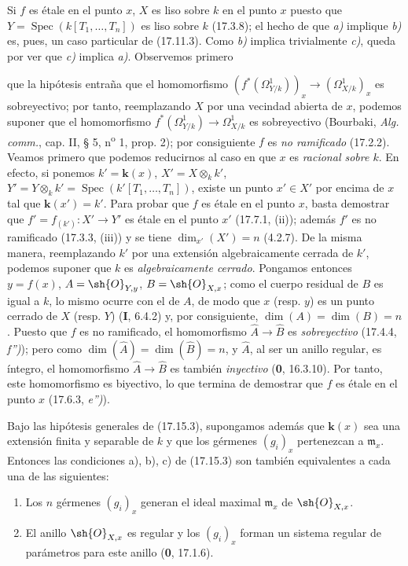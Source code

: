 Si $f$ es étale en el punto $x$, $X$ es liso sobre $k$ en el punto $x$ puesto que $Y=\operatorname{Spec}(k[T_1,\ldots,T_n])$ es liso sobre $k$ (17.3.8); el hecho de que \emph{a)} implique \emph{b)} es, pues, un caso particular de (17.11.3). Como \emph{b)} implica trivialmente \emph{c)}, queda por ver que \emph{c)} implica \emph{a)}. Observemos primero


que la hipótesis entraña que el homomorfismo $(f^*(\varOmega^1_{Y/k}))_x\to(\varOmega^1_{X/k})_x$ es sobreyectivo; por tanto, reemplazando $X$ por una vecindad abierta de $x$, podemos suponer que el homomorfismo $f^*(\varOmega^1_{Y/k})\to\varOmega^1_{X/k}$ es sobreyectivo (Bourbaki, \emph{Alg. comm.}, cap. II, § 5, n\textsuperscript{o} 1, prop. 2); por consiguiente $f$ es \emph{no ramificado} (17.2.2). Veamos primero que podemos reducirnos al caso en que $x$ es \emph{racional sobre $k$}. En efecto, si ponemos $k'=\boldsymbol k(x)$, $X'=X\otimes_k k'$, $Y'=Y\otimes_k k'=\operatorname{Spec}(k'[T_1,\ldots,T_n])$, existe un punto $x'\in X'$ por encima de $x$ tal que $\boldsymbol k(x')=k'$. Para probar que $f$ es étale en el punto $x$, basta demostrar que $f'=f_{(k')}:X'\to Y'$ es étale en el punto $x'$ (17.7.1, (ii)); además $f'$ es no ramificado (17.3.3, (iii)) y se tiene $\dim_{x'}(X')=n$ (4.2.7). De la misma manera, reemplazando $k'$ por una extensión algebraicamente cerrada de $k'$, podemos suponer que $k$ es \emph{algebraicamente cerrado}. Pongamos entonces $y=f(x)$, $A=\sh{O}_{Y,y}$, $B=\sh{O}_{X,x}$; como el cuerpo residual de $B$ es igual a $k$, lo mismo ocurre con el de $A$, de modo que $x$ (resp. $y$) es un punto cerrado de $X$ (resp. $Y$) (\textbf I, 6.4.2) y, por consiguiente, $\dim(A)=\dim(B)=n$. Puesto que $f$ es no ramificado, el homomorfismo $\widehat A\to\widehat B$ es \emph{sobreyectivo} (17.4.4, \emph{f'')}); pero como $\dim(\widehat A)=\dim(\widehat B)=n$, y $\widehat A$, al ser un anillo regular, es íntegro, el homomorfismo $\widehat A\to\widehat B$ es también \emph{inyectivo} (\textbf 0, 16.3.10). Por tanto, este homomorfismo es biyectivo, lo que termina de demostrar que $f$ es étale en el punto $x$ (17.6.3, \emph{e'')}).

\begin{corollary}[17.15.4]
\label{IV.17.15.4}
Bajo las hipótesis generales de \textup{(17.15.3)}, supongamos además que $\boldsymbol k(x)$ sea una extensión \textup{finita} y \textup{separable} de $k$ y que los gérmenes $(g_i)_x$ pertenezcan a $\mathfrak m_x$. Entonces las condiciones \textup{a), b), c)} de \textup{(17.15.3)} son también equivalentes a cada una de las siguientes:
\begin{enumerate}
  \item[\textup{d)}] Los $n$ gérmenes $(g_i)_x$ generan el ideal maximal $\mathfrak m_x$ de $\sh{O}_{X,x}$.
  \item[\textup{d$'$)}] El anillo $\sh{O}_{X,x}$ es regular y los $(g_i)_x$ forman un sistema regular de parámetros para este anillo \textup{(\textbf 0, 17.1.6)}.
\end{enumerate}
\end{corollary}

